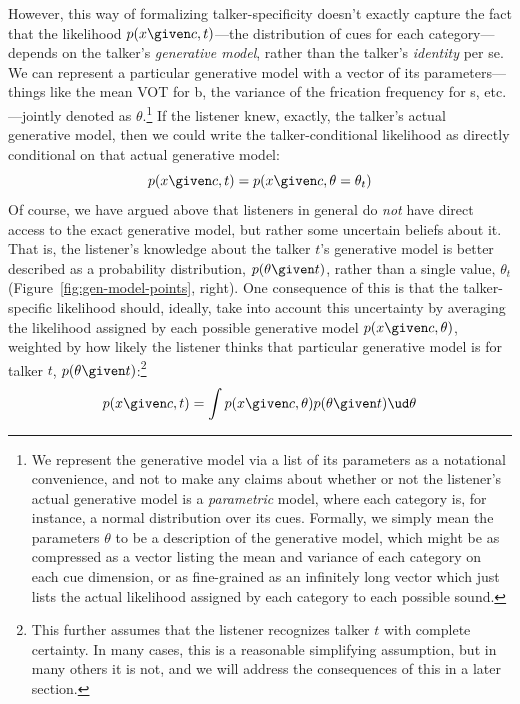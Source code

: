 However, this way of formalizing talker-specificity doesn't exactly capture the fact that the likelihood $p(x \given c, t)$---the distribution of cues for each category---depends on the talker's \emph{generative model}, rather than the talker's \emph{identity} per se.  We can represent a particular generative model with a vector of its parameters---things like the mean VOT for \ph b, the variance of the frication frequency for \ph s, etc.---jointly denoted as $\theta$.\footnote{\label{note:gen-mod-params}We represent the generative model via a list of its parameters as a notational convenience, and not to make any claims about whether or not the listener's actual generative model is a \emph{parametric} model, where each category is, for instance, a normal distribution over its cues.  Formally, we simply mean the parameters $\theta$ to be a description of the generative model, which might be as compressed as a vector listing the mean and variance of each category on each cue dimension, or as fine-grained as an infinitely long vector which just lists the actual likelihood assigned by each category to each possible sound.}  If the listener knew, exactly, the talker's actual generative model, then we could write the talker-conditional likelihood as directly conditional on that actual generative model: 
\begin{equation}
  \label{eq:26}
  p(x \given c, t) = p(x \given c, \theta=\theta_t)
\end{equation}
Of course, we have argued above that listeners in general do \emph{not} have direct access to the exact generative model, but rather some uncertain beliefs about it.  That is, the listener's knowledge about the talker $t$'s generative model is better described as a probability distribution, $p(\theta \given t)$, rather than a single value, $\theta_t$ (Figure~\ref{fig:gen-model-points}, right).  One consequence of this is that the talker-specific likelihood should, ideally, take into account this uncertainty by averaging the likelihood assigned by each possible generative model $p(x \given c, \theta)$, weighted by how likely the listener thinks that particular generative model is for talker $t$, $p(\theta \given t)$:\footnote{This further assumes that the listener recognizes talker $t$ with complete certainty.  In many cases, this is a reasonable simplifying assumption, but in many others it is not, and we will address the consequences of this in a later section.} 
\begin{equation}
  \label{eq:27}
  p(x \given c, t) = \int p(x \given c, \theta) p(\theta \given t) \ud \theta
\end{equation}

